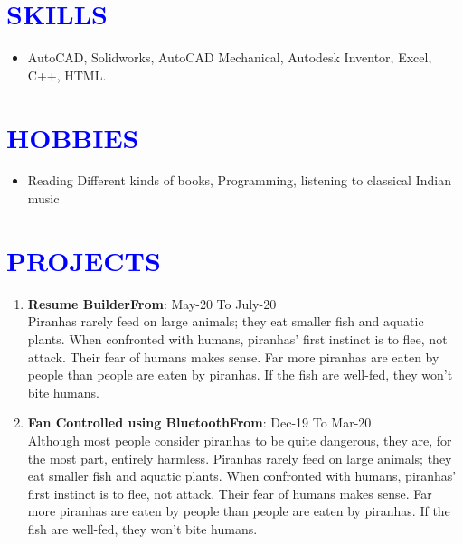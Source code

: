 \documentclass{article}
\begin{document}
\section*{\large{\textcolor{blue}{\uppercase{Skills}}}}

\vspace{4pt}
\begin{itemize}[noitemsep,nolistsep]
	\item AutoCAD, Solidworks, AutoCAD Mechanical, Autodesk Inventor, Excel, C++, HTML.
\end{itemize}
\vspace{3pt}

\section*{\large{\textcolor{blue}{\uppercase{Hobbies}}}}

\vspace{4pt}
\begin{itemize}[noitemsep,nolistsep]
	\item Reading Different kinds of books, Programming, listening to classical Indian music
\end{itemize}

\vspace{3pt}
\section*{\large{\textcolor{blue}{\uppercase{projects}}}}

\vspace{4pt}
\begin{enumerate}
	\item {\textbf{Resume Builder}}\hfill {\textbf{From}}: May-20 To July-20\\
	Piranhas rarely feed on large animals; they eat smaller fish and aquatic plants. When confronted with humans, piranhas’ first instinct is to flee, not attack. Their fear of humans makes sense. Far more piranhas are eaten by people than people are eaten by piranhas. If the fish are well-fed, they won’t bite humans.
	\item {\textbf{Fan Controlled using Bluetooth}}\hfill {\textbf{From}}: Dec-19 To Mar-20\\
	Although most people consider piranhas to be quite dangerous, they are, for the most part, entirely harmless. Piranhas rarely feed on large animals; they eat smaller fish and aquatic plants. When confronted with humans, piranhas’ first instinct is to flee, not attack. Their fear of humans makes sense. Far more piranhas are eaten by people than people are eaten by piranhas. If the fish are well-fed, they won’t bite humans.
\end{enumerate}
	
\end{document}
